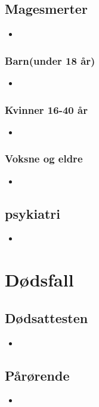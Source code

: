 \begin{itemize}
	\section{Magesmerter}
		\begin{itemize}
			\item
		\end{itemize}
		\subsection{Barn(under 18 år)}
			\begin{itemize}
				\item
			\end{itemize}
		\subsection{Kvinner 16-40 år}
			\begin{itemize}
				\item
			\end{itemize}
		\subsection{Voksne og eldre}
			\begin{itemize}
				\item
			\end{itemize}
	\section{psykiatri}
		\begin{itemize}
			\item
		\end{itemize}

\newpage
\chapter{Dødsfall}
	\section{Dødsattesten}
		\begin{itemize}
			\item
		\end{itemize}
	\section{Pårørende}
		\begin{itemize}
			\item
		\end{itemize}

\end{itemize}
